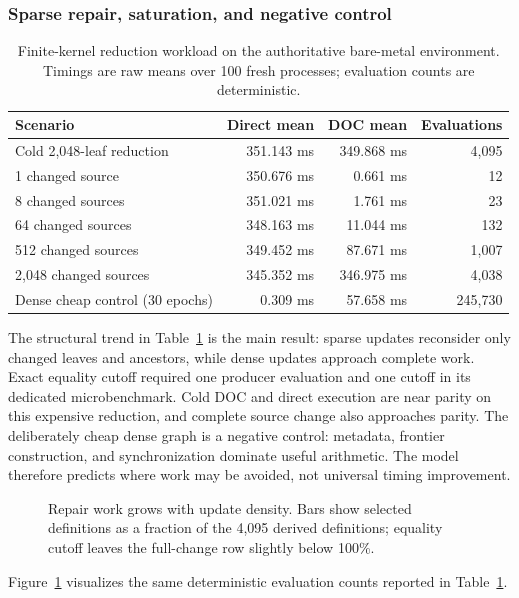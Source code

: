 \subsubsection{Sparse repair, saturation, and negative control}
\begin{table}[t]
\centering\footnotesize
\caption{Finite-kernel reduction workload on the authoritative bare-metal environment. Timings are raw means over 100 fresh processes; evaluation counts are deterministic.}\label{tab:reduction}
\begin{tabular}{@{}lrrr@{}}\toprule
Scenario & Direct mean & DOC mean & Evaluations\\ \midrule
Cold 2,048-leaf reduction & 351.143 ms & 349.868 ms & 4,095\\
1 changed source & 350.676 ms & 0.661 ms & 12\\
8 changed sources & 351.021 ms & 1.761 ms & 23\\
64 changed sources & 348.163 ms & 11.044 ms & 132\\
512 changed sources & 349.452 ms & 87.671 ms & 1,007\\
2,048 changed sources & 345.352 ms & 346.975 ms & 4,038\\
Dense cheap control (30 epochs) & 0.309 ms & 57.658 ms & 245,730\\ \bottomrule
\end{tabular}
\end{table}
The structural trend in Table~\ref{tab:reduction} is the main result: sparse updates reconsider only changed leaves and ancestors, while dense updates approach complete work. Exact equality cutoff required one producer evaluation and one cutoff in its dedicated microbenchmark. Cold DOC and direct execution are near parity on this expensive reduction, and complete source change also approaches parity. The deliberately cheap dense graph is a negative control: metadata, frontier construction, and synchronization dominate useful arithmetic. The model therefore predicts where work may be avoided, not universal timing improvement.

\iffullvisuals
\begin{figure}[t]
\centering
{}
\caption{Repair work grows with update density. Bars show selected definitions as a fraction of the 4,095 derived definitions; equality cutoff leaves the full-change row slightly below 100\%.}\label{fig:repair-density}
\end{figure}
Figure~\ref{fig:repair-density} visualizes the same deterministic evaluation counts reported in Table~\ref{tab:reduction}.
\fi

